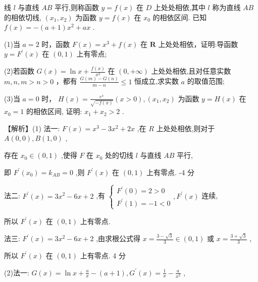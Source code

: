 \documentclass[10pt]{article}
\begin{document}
线 \(l\) 与直线 \({AB}\) 平行,则称函数 \(y = f\left( x\right)\) 在 \(D\) 上处处相依,其中 \(l\) 称为直线 \({AB}\) 的相依切线, \(\left( {{x}_{1},{x}_{2}}\right)\) 为函数 \(y = f\left( x\right)\) 在 \({x}_{0}\) 的相依区间. 已知 \(f\left( x\right)  =  - \left( {a + 1}\right) {x}^{2} + {ax}\) .

(1)当 \(a = 2\) 时，函数 \(F\left( x\right)  = {x}^{3} + f\left( x\right)\) 在 \(\mathbf{R}\) 上处处相依，证明:导函数 \(y = {F}^{\prime }\left( x\right)\) 在 \(\left( {0,1}\right)\) 上有零点;

(2)若函数 \(G\left( x\right)  = \ln x + \frac{f\left( x\right) }{{x}^{2}}\) 在 \(\left( {0, + \infty }\right)\) 上处处相依,且对任意实数 \(m,n,m > n > 0\) ，都有 \(\frac{G\left( m\right)  - G\left( n\right) }{m - n} \leq  1\) 恒成立,求实数 \(a\) 的取值范围;

(3)当 \(a = 0\) 时， \(H\left( x\right)  = \frac{{e}^{x}}{\sqrt{-f\left( x\right) }}\left( {x > 0}\right) ,\left( {{x}_{1},{x}_{2}}\right)\) 为函数 \(y = H\left( x\right)\) 在 \({x}_{0} = 1\) 的相依区间, 证明: \({x}_{1} + {x}_{2} > 2\) .

【解析】(1) 法一: \(F\left( x\right)  = {x}^{3} - 3{x}^{2} + {2x}\) ,在 \(R\) 上处处相依,则对于 \(A\left( {0,0}\right) ,B\left( {1,0}\right)\) ,

存在 \({x}_{0} \in  \left( {0,1}\right)\) ,使得 \(F\) 在 \({x}_{0}\) 处的切线 \(l\) 与直线 \({AB}\) 平行,

即 \({F}^{\prime }\left( {x}_{0}\right)  = {k}_{AB} = 0\) ,则 \({F}^{\prime }\left( x\right)\) 在 \(\left( {0,1}\right)\) 上有零点. -4 分

法二: \({F}^{\prime }\left( x\right)  = 3{x}^{2} - {6x} + 2\) ,有 \(\left\{  \begin{array}{l} {F}^{\prime }\left( 0\right)  = 2 > 0 \\  {F}^{\prime }\left( 1\right)  =  - 1 < 0 \end{array}\right. ,{F}^{\prime }\left( x\right)\) 连续,

所以 \({F}^{\prime }\left( x\right)\) 在 \(\left( {0,1}\right)\) 上有零点.

法三: \({F}^{\prime }\left( x\right)  = 3{x}^{2} - {6x} + 2\) ,由求根公式得 \(x = \frac{3 - \sqrt{3}}{3} \in  \left( {0,1}\right)\) 或 \(x = \frac{3 + \sqrt{3}}{3}\) ,

所以 \({F}^{\prime }\left( x\right)\) 在 \(\left( {0,1}\right)\) 上有零点. 4 分

(2)法一: \(G\left( x\right)  = \ln x + \frac{a}{x} - \left( {a + 1}\right) ,{G}^{\prime }\left( x\right)  = \frac{1}{x} - \frac{a}{{x}^{2}}\) ,
\end{document}

